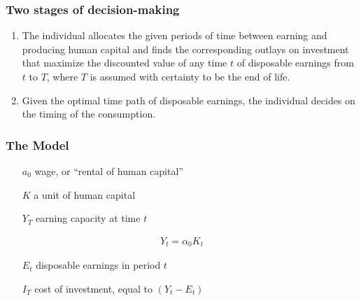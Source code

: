 \documentclass[12pt,a4paper]{article}
\begin{document}
  \subsubsection{Two stages of decision-making}
  \begin{enumerate}[label={\alph*)}]
      \item The individual allocates the given periods of time between earning and producing human capital and finds the corresponding outlays on investment that maximize the discounted value of any time $t$ of disposable earnings from $t$ to $T$, where $T$ is assumed with certainty to be the end of life.
      \item Given the optimal time path of disposable earnings, the individual decides on the timing of the consumption.
    \end{enumerate}
  \subsubsection{The Model} %
  \setcounter{equation}{0}
  \begin{itemize}
    \item[$a_0$] wage, or ``rental of human capital''
    \item[$K$] a unit of human capital
    \item[$Y_T$] earning capacity at time $t$
  \end{itemize}

  \begin{align}
    Y_t=\alpha_0K_t
  \end{align}

  \begin{itemize}
    \item[$E_t$] disposable earnings in period $t$
    \item[$I_T$] cost of investment, equal to $(Y_t-E_t)$
  \end{itemize}
\end{document}
